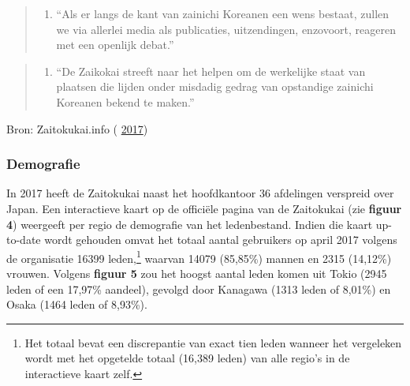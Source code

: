 \documentclass[10.5pt,dutch,]{article}
\providecommand{\tightlist}{%
  \setlength{\itemsep}{0pt}\setlength{\parskip}{0pt}}
\begin{document}
\begin{quote}
\begin{enumerate}
\def\labelenumi{\arabic{enumi}.}
\setcounter{enumi}{5}
\tightlist
\item
  ``Als er langs de kant van zainichi Koreanen een wens bestaat, zullen
  we via allerlei media als publicaties, uitzendingen, enzovoort,
  reageren met een openlijk debat.''
\end{enumerate}
\end{quote}

\begin{quote}
\begin{enumerate}
\def\labelenumi{\arabic{enumi}.}
\setcounter{enumi}{6}
\tightlist
\item
  ``De Zaikokai streeft naar het helpen om de werkelijke staat van
  plaatsen die lijden onder misdadig gedrag van opstandige zainichi
  Koreanen bekend te maken.''
\end{enumerate}
\end{quote}

Bron: Zaitokukai.info (
\protect\hyperlink{ref-zaitokukai.infoux5fzaitokukaiux5f2017}{2017})

\subsubsection{Demografie}\label{demografie}

In 2017 heeft de Zaitokukai naast het hoofdkantoor 36 afdelingen
verspreid over Japan. Een interactieve kaart op de officiële pagina van
de Zaitokukai (zie \textbf{figuur 4}) weergeeft per regio de demografie
van het ledenbestand. Indien die kaart up-to-date wordt gehouden omvat
het totaal aantal gebruikers op april 2017 volgens de organisatie 16399
leden,\footnote{Het totaal bevat een discrepantie van exact tien leden
  wanneer het vergeleken wordt met het opgetelde totaal (16,389 leden)
  van alle regio's in de interactieve kaart zelf.} waarvan 14079
(85,85\%) mannen en 2315 (14,12\%) vrouwen. Volgens \textbf{figuur 5}
zou het hoogst aantal leden komen uit Tokio (2945 leden of een 17,97\%
aandeel), gevolgd door Kanagawa (1313 leden of 8,01\%) en Osaka (1464
leden of 8,93\%).
\end{document}
